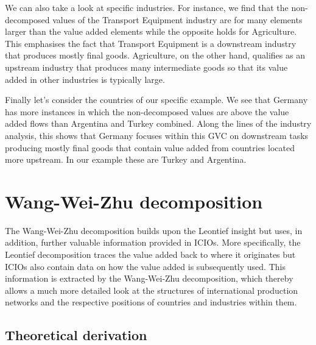 \documentclass[a4paper,11pt]{article}
\begin{document}
We can also take a look at specific industries. For instance, we find that the non-decomposed values of the Transport Equipment industry are for many elements larger than the value added elements while the opposite holds for Agriculture. This emphasises the fact that Transport Equipment is a downstream industry that produces mostly final goods. Agriculture, on the other hand, qualifies as an upstream industry that produces many intermediate goods so that its value added in other industries is typically large.

Finally let's consider the countries of our specific example. We see that Germany has more instances in which the non-decomposed values are above the value added flows than Argentina and Turkey combined.
Along the lines of the industry analysis, this shows that Germany focuses within this GVC on downstream tasks producing mostly final goods that contain value added from countries located more upstream. In our example these are Turkey and Argentina.


\section{Wang-Wei-Zhu decomposition}
\label{sec:wwz}
The Wang-Wei-Zhu decomposition builds upon the Leontief insight but uses, in addition, further valuable information provided in ICIOs.
More specifically, the Leontief decomposition traces the value added back to where it originates but ICIOs also contain data on how the value added is subsequently used.
This information is extracted by the Wang-Wei-Zhu decomposition, 
which thereby allows a much more detailed look at the structures of international production networks and the respective positions of countries and industries within them.

\subsection{Theoretical derivation}
\end{document}
